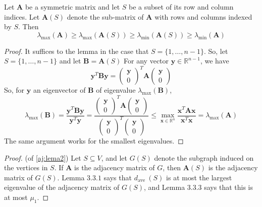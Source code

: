 \documentclass{article}
\begin{document}
\begin{lema}
  Let $\boldsymbol{A}$ be a symmetric matrix and let $S$ be a subset of its row and column indices. Let $\boldsymbol{A}(S)$ denote the sub-matrix of $\boldsymbol{A}$ with rows and columns indexed by $S$. Then
$$
\lambda_{\max }(\boldsymbol{A}) \geq \lambda_{\max }(\boldsymbol{A}(S)) \geq \lambda_{\min }(\boldsymbol{A}(S)) \geq \lambda_{\min }(\boldsymbol{A})
$$
\end{lema}
\begin{proof}
It suffices to the lemma in the case that $S=\{1, \ldots, n-1\} .$ So, let $S=\{1, \ldots, n-1\}$ and let $\boldsymbol{B}=\boldsymbol{A}(S)$
For any vector $\boldsymbol{y} \in \mathbb{R}^{n-1}$, we have
$$
\boldsymbol{y}^{T} \boldsymbol{B} \boldsymbol{y}=\left(\begin{array}{l}
\boldsymbol{y} \\
0
\end{array}\right)^{T} \boldsymbol{A}\left(\begin{array}{l}
\boldsymbol{y} \\
0
\end{array}\right)
$$
So, for $\boldsymbol{y}$ an eigenvector of $\boldsymbol{B}$ of eigenvalue $\lambda_{\max }(\boldsymbol{B})$,
$$
\lambda_{\max }(\boldsymbol{B})=\frac{\boldsymbol{y}^{T} \boldsymbol{B} \boldsymbol{y}}{\boldsymbol{y}^{T} \boldsymbol{y}}=\frac{\left(\begin{array}{l}
\boldsymbol{y} \\
0
\end{array}\right)^{T} \boldsymbol{A}\left(\begin{array}{l}
\boldsymbol{y} \\
0
\end{array}\right)}{\left(\begin{array}{l}
\boldsymbol{y} \\
0
\end{array}\right)^{T}\left(\begin{array}{l}
\boldsymbol{y} \\
0
\end{array}\right)} \leq \max _{\boldsymbol{x} \in \mathbb{R}^{n}} \frac{\boldsymbol{x}^{T} \boldsymbol{A} \boldsymbol{x}}{\boldsymbol{x}^{T} \boldsymbol{x}}=\lambda_{\max }(\boldsymbol{A})
$$
The same argument works for the smallest eigenvalues.
\end{proof}
\begin{proof} (of \cref{aj:lema2})
Let $S \subseteq V$, and let $G(S)$ denote the subgraph induced on the vertices in $S$. If $\boldsymbol{A}$ is the adjacency matrix of $G$, then $\boldsymbol{A}(S)$ is the adjacency matrix of $G(S) .$ Lemma $3.3 .1$ says that $d_{\text {ave }}(S)$ is at most the largest eigenvalue of the adjacency matrix of $G(S)$, and Lemma 3.3.3 says that this is at most $\mu_{1}$.
\end{proof}  
\end{document}
